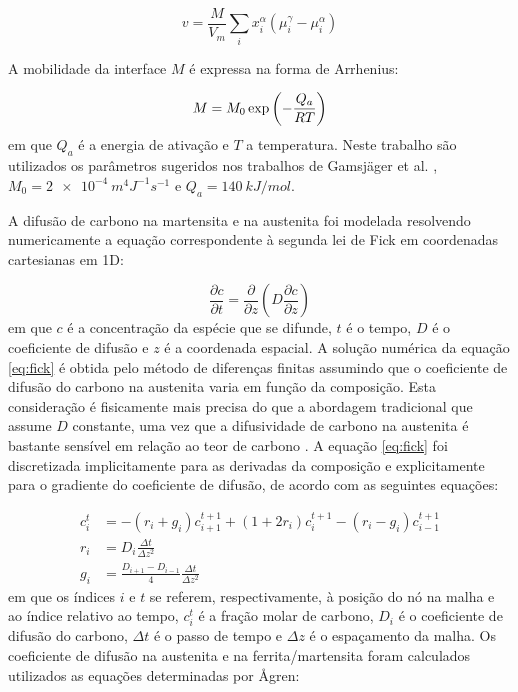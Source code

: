 \begin{equation}
  v = \frac{M}{V_m} \sum_i x_i^\alpha \left( \mu_i^{\gamma} - \mu_i^{\alpha} \right)
  \label{eq:int_velocity}
\end{equation}

A mobilidade da interface $M$ é expressa na forma de Arrhenius:

\begin{equation}
  M = M_0 \exp \left( -\frac{Q_a}{R\*T} \right)
  \label{eq:int_mobility}
\end{equation}
%
em que $Q_a$ é a energia de ativação e $T$ a temperatura. Neste trabalho são utilizados os parâmetros sugeridos nos trabalhos de Gamsjäger et al. \cite{Gamsjager2006,Chen2014}, $M_0 = \SI{2e-4}{m^4J^{-1}s^{-1}}$ e $Q_a = \SI{140}{kJ/mol}$.

A difusão de carbono na martensita e na austenita foi modelada resolvendo numericamente a equação correspondente à segunda lei de Fick em coordenadas cartesianas em 1D:

\begin{equation}
  \frac{\partial c}{\partial t} = \frac{\partial}{\partial z} \left( D \frac{\partial c}{\partial z} \right)
  \label{eq:fick}
\end{equation}
%
em que $c$ é a concentração da espécie que se difunde, $t$ é o tempo, $D$ é o coeficiente de difusão e $z$ é a coordenada espacial. A solução numérica da equação \ref{eq:fick} é obtida pelo método de diferenças finitas assumindo que o coeficiente de difusão do carbono na austenita varia em função da composição. Esta consideração é fisicamente mais precisa do que a abordagem tradicional que assume $D$ constante, uma vez que a difusividade de carbono na austenita é bastante sensível em relação ao teor de carbono \cite{Hillert1993}. A equação \ref{eq:fick} foi discretizada implicitamente para as derivadas da composição e explicitamente para o gradiente do coeficiente de difusão, de acordo com as seguintes equações:

\begin{align}
  c^t_i &= -\left(r_{i} + g_{i}\right) c^{t+1}_{i+1} + \left(1 + 2 r_{i}\right) c^{t+1}_{i} - \left(r_{i} - g_{i}\right) c^{t+1}_{i-1} \\
  r_{i} &= D_{i} \frac{\Delta t}{\Delta z^2} \\
  g_{i} &= \frac{D_{i+1} - D_{i-1}}{4} \frac{\Delta t}{\Delta z^2} \label{eq:FDM_g}
\end{align}
%
em que os índices $i$ e $t$ se referem, respectivamente, à posição do nó na malha e ao índice relativo ao tempo, $c^t_i$ é a fração molar de carbono, $D_i$ é o coeficiente de difusão do carbono, $\Delta t$ é o passo de tempo e $\Delta z$ é o espaçamento da malha. Os coeficiente de difusão na austenita e na ferrita/martensita foram calculados utilizados as equações determinadas por {\AA}gren\cite{Agren1982,Agren1986}:

